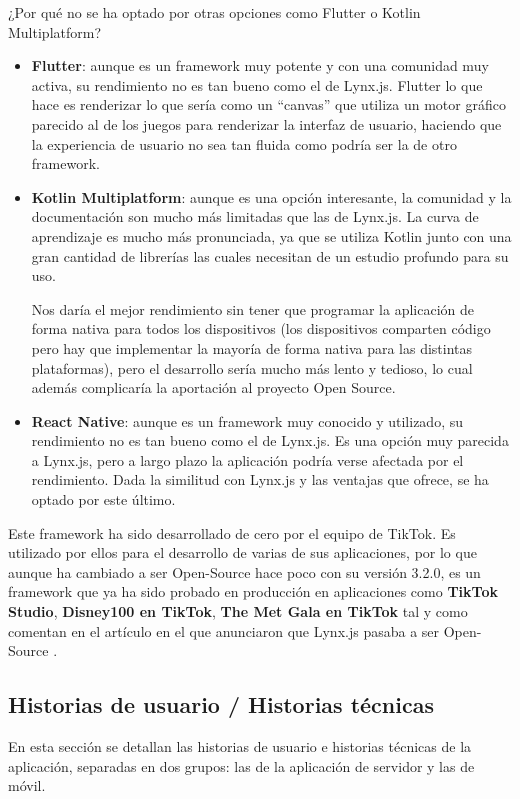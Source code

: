¿Por qué no se ha optado por otras opciones como Flutter o Kotlin Multiplatform?
\begin{itemize}
    \item \textbf{Flutter}: aunque es un framework muy potente y con una comunidad muy activa, su rendimiento no es tan bueno como el de Lynx.js. 
        Flutter lo que hace es renderizar lo que sería como un ``canvas'' que utiliza un motor gráfico parecido al de los juegos para renderizar la interfaz de usuario, haciendo que la experiencia de usuario no sea tan fluida como podría ser la de otro framework. 
    \item \textbf{Kotlin Multiplatform}: aunque es una opción interesante, la comunidad y la documentación son mucho más limitadas que las de Lynx.js. La curva de aprendizaje es mucho más pronunciada, ya que se utiliza Kotlin junto con una gran cantidad de librerías las cuales necesitan de un estudio profundo para su uso.

        Nos daría el mejor rendimiento sin tener que programar la aplicación de forma nativa para todos los dispositivos (los dispositivos comparten código pero hay que implementar la mayoría de forma nativa para las distintas plataformas), pero el desarrollo sería mucho más lento y tedioso, lo cual además complicaría la aportación al proyecto Open Source.
    \item \textbf{React Native}: aunque es un framework muy conocido y utilizado, su rendimiento no es tan bueno como el de Lynx.js.
        Es una opción muy parecida a Lynx.js, pero a largo plazo la aplicación podría verse afectada por el rendimiento.
        Dada la similitud con Lynx.js y las ventajas que ofrece, se ha optado por este último.
\end{itemize}

Este framework ha sido desarrollado de cero por el equipo de TikTok. Es utilizado por ellos para el desarrollo de varias de sus aplicaciones, por lo que aunque ha cambiado a ser Open-Source hace poco con su versión 3.2.0, es un framework que ya ha sido probado en producción en aplicaciones como \textbf{TikTok Studio}, \textbf{Disney100 en TikTok}, \textbf{The Met Gala en TikTok} tal y como comentan en el artículo en el que anunciaron que Lynx.js pasaba a ser Open-Source \parencite{lynx-article}.

\subsection{Historias de usuario / Historias técnicas}
En esta sección se detallan las historias de usuario e historias técnicas de la aplicación, separadas en dos grupos: las de la aplicación de servidor y las de móvil.

